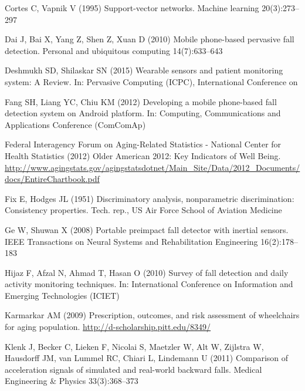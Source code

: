 \documentclass[twocolumn]{svjour3}          \smartqed  \usepackage[draft]{hyperref}
\begin{document}
\begin{thebibliography}{41}
Cortes C, Vapnik V (1995) Support-vector networks. Machine learning
  20(3):273--297

Dai J, Bai X, Yang Z, Shen Z, Xuan D (2010) Mobile phone-based pervasive fall
  detection. Personal and ubiquitous computing 14(7):633--643

Deshmukh SD, Shilaskar SN (2015) Wearable sensors and patient monitoring
  system: {A} {Review}. In: Pervasive {Computing} ({ICPC}), {International}
  {Conference} on

Fang SH, Liang YC, Chiu KM (2012) Developing a mobile phone-based fall
  detection system on {Android} platform. In: Computing, {Communications} and
  {Applications} {Conference} ({ComComAp})

{Federal Interagency Forum on Aging-Related Statistics - National Center for
  Health Statistics} (2012) {Older American 2012: Key Indicators of Well
  Being}.
  \urlprefix\url{http://www.agingstats.gov/agingstatsdotnet/Main\_Site/Data/2012\_Documents/docs/EntireChartbook.pdf}

Fix E, Hodges JL (1951) Discriminatory analysis, nonparametric discrimination:
  Consistency properties. Tech. rep., US Air Force School of Aviation Medicine

Ge W, Shuwan X (2008) Portable preimpact fall detector with inertial sensors.
  IEEE Transactions on Neural Systems and Rehabilitation Engineering
  16(2):178--183

Hijaz F, Afzal N, Ahmad T, Hasan O (2010) Survey of fall detection and daily
  activity monitoring techniques. In: International Conference on Information
  and Emerging Technologies ({ICIET})

Karmarkar AM (2009) Prescription, outcomes, and risk assessment of wheelchairs
  for aging population. \urlprefix\url{http://d-scholarship.pitt.edu/8349/}

Klenk J, Becker C, Lieken F, Nicolai S, Maetzler W, Alt W, Zijlstra W,
  Hausdorff JM, van Lummel RC, Chiari L, Lindemann U (2011) Comparison of
  acceleration signals of simulated and real-world backward falls. Medical
  Engineering \& Physics 33(3):368--373


\end{thebibliography}
\end{document}
